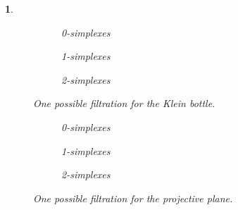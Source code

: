\documentclass[10pt]{article} %
\theoremstyle{problemstyle}
\newtheorem{question}{\arabic{question}}
\begin{document}
\begin{question}
\begin{figure}[H]
	\centering
	\begin{subfigure}{0.3\linewidth}
		\centering
		\begin{mdframed}[roundcorner=10pt]
			\centering
			
		\end{mdframed}
		\caption{0-simplexes}
		\label{fig:kl-0-simplex} 
	\end{subfigure}
	\hfill
	\begin{subfigure}{0.3\linewidth}
		\centering
		\begin{mdframed}[roundcorner=10pt]
			\centering
			
		\end{mdframed}
		\caption{1-simplexes}
		\label{fig:kl-1-simplex} 
	\end{subfigure}
	\hfill
	\begin{subfigure}[H]{0.3\linewidth}
		\centering
		\begin{mdframed}[roundcorner=10pt]
			\centering
			
		\end{mdframed}
		\caption{2-simplexes}
		\label{fig:kl-2-simplex}
	\end{subfigure}
	\centering
	\caption{One possible filtration for the Klein bottle.}
	\label{fig:kl}
\end{figure}

\begin{figure}[H]
	\centering
	\begin{subfigure}{0.32\linewidth}
		\begin{mdframed}[roundcorner=10pt]
			\centering
			
		\end{mdframed}
		\caption{0-simplexes}
		\label{fig:pp-0-simplex} 
	\end{subfigure}
	\hfill
	\begin{subfigure}{0.32\linewidth}
		\begin{mdframed}[roundcorner=10pt]
			\centering
			
		 \end{mdframed}
		\caption{1-simplexes}
		\label{fig:pp-1-simplex} 
	\end{subfigure}
	\hfill
	\begin{subfigure}[H]{0.32\linewidth}
		\begin{mdframed}[roundcorner=10pt]
			\centering
			
		\end{mdframed}
		\caption{2-simplexes}
		\label{fig:pp-2-simplex}
	\end{subfigure}
	\centering
	\caption{One possible filtration for the projective plane.}
	\label{fig:pp}
\end{figure}


\end{question}
\end{document}
